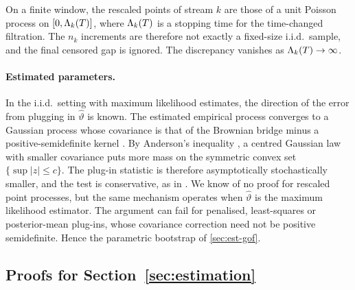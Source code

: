 On a finite window, the rescaled points of stream $k$ are those of a unit Poisson process
on $[0,\Lambda_k(T)]$, where $\Lambda_k(T)$ is a stopping time for the time-changed filtration.
The $n_k$ increments are therefore not exactly a fixed-size i.i.d.\ sample, and the final
censored gap is ignored. The discrepancy vanishes as $\Lambda_k(T)\to\infty$.

\paragraph{Estimated parameters.} In the i.i.d.\ setting with maximum likelihood
estimates, the direction of the error from plugging in $\hat\vartheta$ is known. The
estimated empirical process converges to a Gaussian process whose covariance is that of the
Brownian bridge minus a positive-semidefinite kernel \citep{durbin1973}. By Anderson's
inequality \citep{anderson1955}, a centred Gaussian law with smaller covariance puts more
mass on the symmetric convex set $\{\sup|z|\le c\}$. The plug-in statistic is therefore
asymptotically stochastically smaller, and the test is conservative, as in
\citet{lilliefors1967}. We know of no proof for rescaled point processes, but the same
mechanism operates when $\hat\vartheta$ is the maximum likelihood estimator. The argument
can fail for penalised, least-squares or posterior-mean plug-ins, whose covariance
correction need not be positive semidefinite. Hence the parametric bootstrap of
\cref{sec:est-gof}.

\subsection{Proofs for Section~\ref{sec:estimation}}\label{app:est-proofs}

